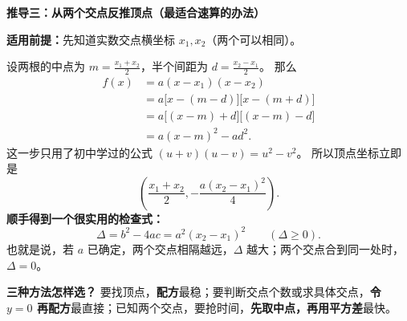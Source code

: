 \clearpage
\begin{proofbox}
\textbf{\textcolor{CProof}{推导三：从两个交点反推顶点（最适合速算的办法）}}


\textbf{适用前提：}先知道实数交点横坐标 $x_1,x_2$（两个可以相同）。

设两根的中点为 $m=\frac{x_1+x_2}{2}$，半个间距为 $d=\frac{x_2-x_1}{2}$。
那么
\[
\begin{aligned}
f(x)&=a(x-x_1)(x-x_2)\\
&=a\bigl[x-(m-d)\bigr]\bigl[x-(m+d)\bigr]\\
&=a\bigl[(x-m)+d\bigr]\bigl[(x-m)-d\bigr]\\
&=a(x-m)^2-ad^2.
\end{aligned}
\]
这一步只用了初中学过的公式 $(u+v)(u-v)=u^2-v^2$。
所以顶点坐标立即是
\[
\boxed{\left(\frac{x_1+x_2}{2},
-\frac{a(x_2-x_1)^2}{4}\right)}.
\]
\textbf{顺手得到一个很实用的检查式：}
\[
\Delta=b^2-4ac=a^2(x_2-x_1)^2\qquad(\Delta\ge0).
\]
也就是说，若 $a$ 已确定，两个交点相隔越远，$\Delta$ 越大；两个交点合到同一处时，$\Delta=0$。

\medskip
\textbf{\textcolor{CProof}{三种方法怎样选？}}
要找顶点，\textbf{配方}最稳；要判断交点个数或求具体交点，\textbf{令 $y=0$ 再配方}最直接；已知两个交点，要抢时间，\textbf{先取中点，再用平方差}最快。
\end{proofbox}

